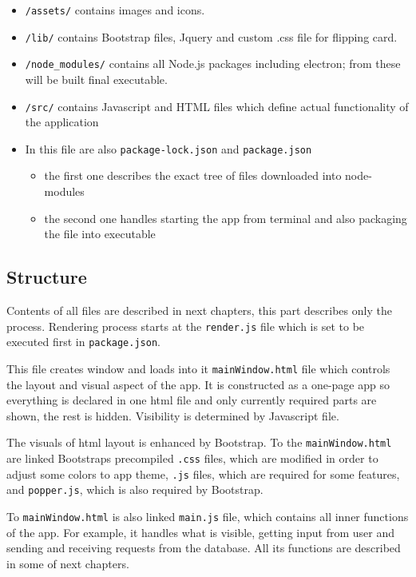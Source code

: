 \documentclass[12pt]{article}
\providecommand{\tightlist}{\setlength{\itemsep}{1pt}\setlength{\parskip}{1pt}}
\let\oldtexttt\texttt
\renewcommand{\texttt}[1]{\oldtexttt{\textcolor{codehighlight}{#1}}}
\begin{document}
\begin{itemize}
\tightlist
\item
  \texttt{/assets/} contains images and icons.
\item
  \texttt{/lib/} contains Bootstrap files, Jquery and custom .css file
  for flipping card.
\item
  \texttt{/node\_modules/} contains all Node.js packages including
  electron; from these will be built final executable.
\item
  \texttt{/src/} contains Javascript and HTML files which define actual
  functionality of the application
\item
  In this file are also \texttt{package-lock.json} and
  \texttt{package.json}

  \begin{itemize}
  \tightlist
  \item
    the first one describes the exact tree of files downloaded into
    node-modules
  \item
    the second one handles starting the app from terminal and also
    packaging the file into executable
  \end{itemize}
\end{itemize}

\hypertarget{structure}{%
\subsection{Structure}\label{structure}}

Contents of all files are described in next chapters, this part
describes only the process. Rendering process starts at the
\texttt{render.js} file which is set to be executed first in
\texttt{package.json}.

This file creates window and loads into it \texttt{mainWindow.html} file
which controls the layout and visual aspect of the app. It is
constructed as a one-page app so everything is declared in one html file
and only currently required parts are shown, the rest is hidden.
Visibility is determined by Javascript file.

The visuals of html layout is enhanced by Bootstrap. To the
\texttt{mainWindow.html} are linked Bootstraps precompiled \texttt{.css}
files, which are modified in order to adjust some colors to app theme,
\texttt{.js} files, which are required for some features, and
\texttt{popper.js}, which is also required by Bootstrap.

To \texttt{mainWindow.html} is also linked \texttt{main.js} file, which
contains all inner functions of the app. For example, it handles what is
visible, getting input from user and sending and receiving requests from
the database. All its functions are described in some of next chapters.
\end{document}
